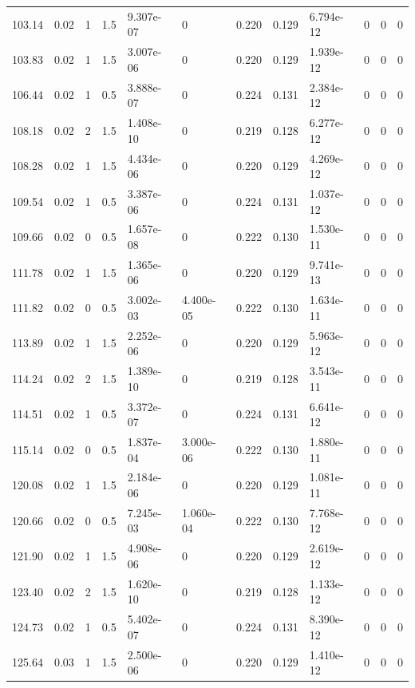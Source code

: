 \documentclass[preview]{standalone}
\begin{document}
{{{\begin{tabular}{L{1.2cm}C{1.2cm} C{0.3cm}C{0.5cm} C{1.4cm}C{1.4cm} C{1.4cm}C{1.4cm} C{1.6cm}C{1.6cm} C{1.6cm}C{1.6cm}}
  103.14  &  0.02  & 1     & 1.5 &  9.307e-07  & 0  &  0.220&   0.129& 6.794e-12 & 0   &  0 & 0  \\ 
  103.83  &  0.02  & 1     & 1.5 &  3.007e-06  & 0  &  0.220&   0.129& 1.939e-12 & 0   &  0 & 0  \\ 
  106.44  &  0.02  & 1     & 0.5 &  3.888e-07  & 0  &  0.224&   0.131& 2.384e-12 & 0   &  0 & 0  \\ 
  108.18  &  0.02  & 2     & 1.5 &  1.408e-10  & 0  &  0.219&   0.128& 6.277e-12 & 0   &  0 & 0  \\ 
  108.28  &  0.02  & 1     & 1.5 &  4.434e-06  & 0  &  0.220&   0.129& 4.269e-12 & 0   &  0 & 0  \\ 
  109.54  &  0.02  & 1     & 0.5 &  3.387e-06  & 0  &  0.224&   0.131& 1.037e-12 & 0   &  0 & 0  \\ 
  109.66  &  0.02  & 0     & 0.5 &  1.657e-08  & 0  &  0.222&   0.130& 1.530e-11 & 0   &  0 & 0  \\ 
  111.78  &  0.02  & 1     & 1.5 &  1.365e-06  & 0  &  0.220&   0.129& 9.741e-13 & 0   &  0 & 0  \\ 
  111.82  &  0.02  & 0     & 0.5 &  3.002e-03  & 4.400e-05  &  0.222&   0.130& 1.634e-11 & 0   &  0 & 0  \\ 
  113.89  &  0.02  & 1     & 1.5 &  2.252e-06  & 0  &  0.220&   0.129& 5.963e-12 & 0   &  0 & 0  \\ 
  114.24  &  0.02  & 2     & 1.5 &  1.389e-10  & 0  &  0.219&   0.128& 3.543e-11 & 0   &  0 & 0  \\ 
  114.51  &  0.02  & 1     & 0.5 &  3.372e-07  & 0  &  0.224&   0.131& 6.641e-12 & 0   &  0 & 0  \\ 
  115.14  &  0.02  & 0     & 0.5 &  1.837e-04  & 3.000e-06  &  0.222&   0.130& 1.880e-11 & 0   &  0 & 0  \\ 
  120.08  &  0.02  & 1     & 1.5 &  2.184e-06  & 0  &  0.220&   0.129& 1.081e-11 & 0   &  0 & 0  \\ 
  120.66  &  0.02  & 0     & 0.5 &  7.245e-03  & 1.060e-04  &  0.222&   0.130& 7.768e-12 & 0   &  0 & 0  \\ 
  121.90  &  0.02  & 1     & 1.5 &  4.908e-06  & 0  &  0.220&   0.129& 2.619e-12 & 0   &  0 & 0  \\ 
  123.40  &  0.02  & 2     & 1.5 &  1.620e-10  & 0  &  0.219&   0.128& 1.133e-12 & 0   &  0 & 0  \\ 
  124.73  &  0.02  & 1     & 0.5 &  5.402e-07  & 0  &  0.224&   0.131& 8.390e-12 & 0   &  0 & 0  \\ 
  125.64  &  0.03  & 1     & 1.5 &  2.500e-06  & 0  &  0.220&   0.129& 1.410e-12 & 0   &  0 & 0  \\ 

\end{tabular}}}}
\end{document}
